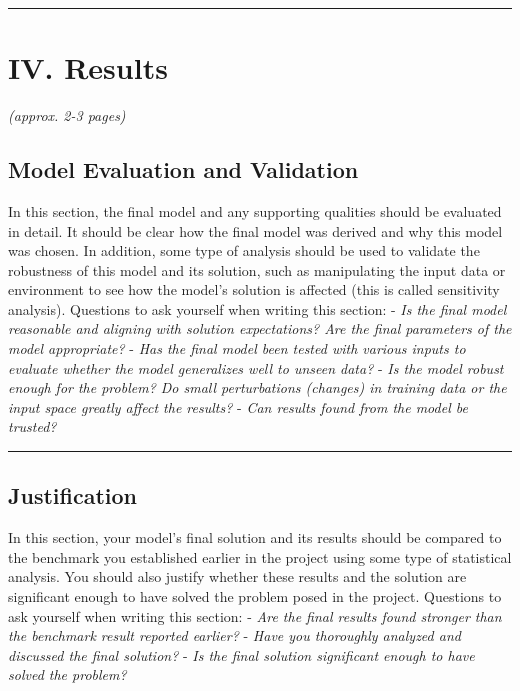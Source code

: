 \documentclass[12pt]{article}
\begin{document}
\begin{center}\rule{0.5\linewidth}{\linethickness}\end{center}

\section{IV. Results}\label{iv.-results}

\emph{(approx. 2-3 pages)}

\subsection{Model Evaluation and Validation}\label{model-evaluation-and-validation}

In this section, the final model and any supporting qualities should be
evaluated in detail. It should be clear how the final model was derived
and why this model was chosen. In addition, some type of analysis should
be used to validate the robustness of this model and its solution, such
as manipulating the input data or environment to see how the model's
solution is affected (this is called sensitivity analysis). Questions to
ask yourself when writing this section: - \emph{Is the final model
reasonable and aligning with solution expectations? Are the final
parameters of the model appropriate?} - \emph{Has the final model been
tested with various inputs to evaluate whether the model generalizes
well to unseen data?} - \emph{Is the model robust enough for the
problem? Do small perturbations (changes) in training data or the input
space greatly affect the results?} - \emph{Can results found from the
model be trusted?}

\begin{center}\rule{0.5\linewidth}{\linethickness}\end{center}

\subsection{Justification}\label{justification}

In this section, your model's final solution and its results should be
compared to the benchmark you established earlier in the project using
some type of statistical analysis. You should also justify whether these
results and the solution are significant enough to have solved the
problem posed in the project. Questions to ask yourself when writing
this section: - \emph{Are the final results found stronger than the
benchmark result reported earlier?} - \emph{Have you thoroughly analyzed
and discussed the final solution?} - \emph{Is the final solution
significant enough to have solved the problem?}
\end{document}

